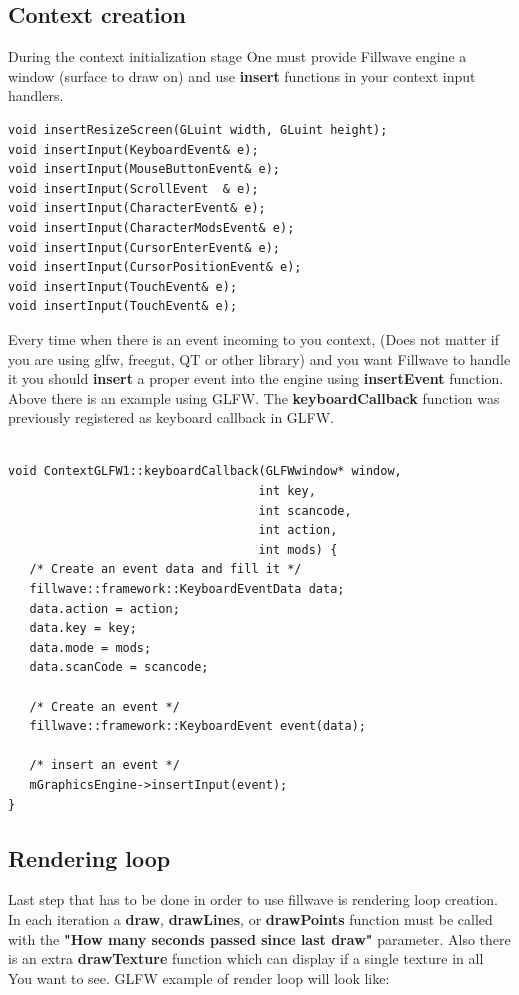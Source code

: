 \documentclass{article}
\begin{document}
\subsection{Context creation}\label{sec:Context}
\indent \indent During the context initialization stage One must provide Fillwave engine a window (surface to draw on) and use \textbf{insert} functions in your context input handlers.

\begin{lstlisting}
void insertResizeScreen(GLuint width, GLuint height);
void insertInput(KeyboardEvent& e);
void insertInput(MouseButtonEvent& e);
void insertInput(ScrollEvent  & e);
void insertInput(CharacterEvent& e);
void insertInput(CharacterModsEvent& e);
void insertInput(CursorEnterEvent& e);
void insertInput(CursorPositionEvent& e);
void insertInput(TouchEvent& e);
void insertInput(TouchEvent& e);
\end{lstlisting}

\indent \indent Every time when there is an event incoming to you context, (Does not matter if you are using glfw, freegut, QT or other library) and you want Fillwave to handle it you should \textbf{insert} a proper event into the engine using \textbf{insertEvent} function. Above there is an example using GLFW. The \textbf{keyboardCallback} function was previously registered as keyboard callback in GLFW.  

\begin{lstlisting}

void ContextGLFW1::keyboardCallback(GLFWwindow* window,
                                   int key,
                                   int scancode,
                                   int action,
                                   int mods) {
   /* Create an event data and fill it */
   fillwave::framework::KeyboardEventData data;
   data.action = action;
   data.key = key;
   data.mode = mods;
   data.scanCode = scancode;
   
   /* Create an event */
   fillwave::framework::KeyboardEvent event(data);
   
   /* insert an event */
   mGraphicsEngine->insertInput(event);
}
\end{lstlisting}

\subsection{Rendering loop}\label{sec:Loop}

\indent \indent Last step that has to be done in order to use fillwave is rendering loop creation. In each iteration a \textbf{draw}, \textbf{drawLines}, or \textbf{drawPoints} function must be called with the \textbf{"How many seconds passed since last draw"} parameter. Also there is an extra \textbf{drawTexture} function which can display if a single texture in all You want to see. GLFW example of render loop will look like:
\end{document}
